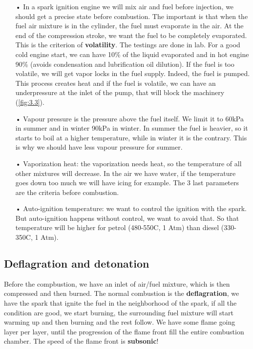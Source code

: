 	\begin{itemize}
	\item[•] In a spark ignition engine we will mix air and fuel before injection, we should get a precise state before combustion. The important is that when the fuel air mixture is in the cylinder, the fuel must evaporate in the air. At the end of the compression stroke, we want the fuel to be completely evaporated. This is the criterion of \textbf{volatility}. The testings are done in lab. For a good cold engine start, we can have 10\% of the liquid evaporated and in hot engine 90\% (avoids condensation and lubrification oil dilution). If the fuel is too volatile, we will get vapor locks in the fuel supply. Indeed, the fuel is pumped. This process creates heat and if the fuel is volatile, we can have an underpressure at the inlet of the pump, that will block the machinery (\autoref{fig:3.3}). \\
	
	\item[•] Vapour pressure is the pressure above the fuel itself. We limit it to 60kPa in summer and in winter 90kPa in winter. In summer the fuel is heavier, so it starts to boil at a higher temperature, while in winter it is the contrary. This is why we should have less vapour pressure for summer.\\
	
	\item[•] Vaporization heat: the vaporization needs heat, so the temperature of all other mixtures will decrease. In the air we have water, if the temperature goes down too much we will have icing for example. The 3 last parameters are the criteria before combustion. \\
	
	\item[•] Auto-ignition temperature: we want to control the ignition with the spark. But auto-ignition happens without control, we want to avoid that. So that temperature will be higher for petrol (480-550\degres C, 1 Atm) than diesel (330-350\degres C, 1 Atm).
	\end{itemize}
	
\subsection{Deflagration and detonation}	
	Before the compbustion, we have an inlet of air/fuel mixture, which is then compressed and then burned. The normal combustion is the \textbf{deflagration}, we have the spark that ignite the fuel in the neighborhood of the spark, if all the condition are good, we start burning, the surrounding fuel mixture will start warming up and then burning and the rest follow. We have some flame going layer per layer, until the progression of the flame front fill the entire combustion chamber. The speed of the flame front is \textbf{subsonic}! \\
	
